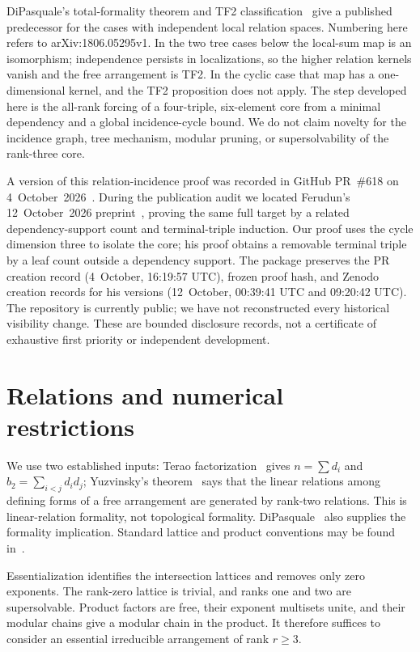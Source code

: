 \documentclass[11pt]{article}
\begin{document}
DiPasquale's total-formality theorem and TF2 classification~\cite[Corollary 4.10, Proposition 6.1]{dip} give a published predecessor for the cases with independent local relation spaces. Numbering here refers to arXiv:1806.05295v1. In the two tree cases below the local-sum map is an isomorphism; independence persists in localizations, so the higher relation kernels vanish and the free arrangement is TF2. In the cyclic case that map has a one-dimensional kernel, and the TF2 proposition does not apply. The step developed here is the all-rank forcing of a four-triple, six-element core from a minimal dependency and a global incidence-cycle bound. We do not claim novelty for the incidence graph, tree mechanism, modular pruning, or supersolvability of the rank-three core.

A version of this relation-incidence proof was recorded in GitHub PR~\#618 on 4~October~2026~\cite{candidate}. During the publication audit we located Ferudun's 12~October~2026 preprint~\cite{ferudun}, proving the same full target by a related dependency-support count and terminal-triple induction. Our proof uses the cycle dimension three to isolate the core; his proof obtains a removable terminal triple by a leaf count outside a dependency support. The package preserves the PR creation record (4~October, 16:19:57 UTC), frozen proof hash, and Zenodo creation records for his versions (12~October, 00:39:41 UTC and 09:20:42 UTC). The repository is currently public; we have not reconstructed every historical visibility change. These are bounded disclosure records, not a certificate of exhaustive first priority or independent development.

\section{Relations and numerical restrictions}
We use two established inputs: Terao factorization~\cite{terao} gives $n=\sum d_i$ and $b_2=\sum_{i<j}d_i d_j$; Yuzvinsky's theorem~\cite{yuz} says that the linear relations among defining forms of a free arrangement are generated by rank-two relations. This is linear-relation formality, not topological formality. DiPasquale~\cite[Corollary 4.10]{dip} also supplies the formality implication. Standard lattice and product conventions may be found in~\cite{ot}.

Essentialization identifies the intersection lattices and removes only zero exponents. The rank-zero lattice is trivial, and ranks one and two are supersolvable. Product factors are free, their exponent multisets unite, and their modular chains give a modular chain in the product. It therefore suffices to consider an essential irreducible arrangement of rank $r\geq 3$.
\end{document}
